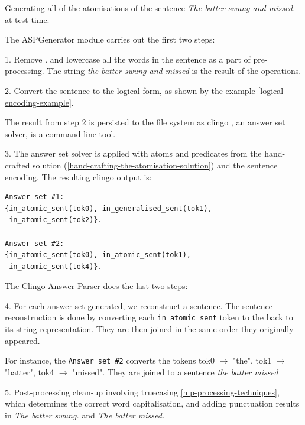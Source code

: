 \begin{example}
Generating all of the atomisations of the sentence \emph{The batter swung and missed.} at test time.

The ASPGenerator module carries out the first two steps:

1. Remove . and lowercase all the words in the sentence as a part of pre-processing. The string \emph{the batter swung and missed} is the result of the operations.

2. Convert the sentence to the logical form, as shown by the example \ref{logical-encoding-example}.

The result from step 2 is persisted to the file system as clingo \cite{RefWorks:RefID:22-clingo}, an answer set solver, is a command line tool.

3. The answer set solver is applied with atoms and predicates from the hand-crafted solution (\ref{hand-crafting-the-atomisation-solution}) and the sentence encoding. The resulting clingo output is:
\begin{verbatim}
Answer set #1: 
{in_atomic_sent(tok0), in_generalised_sent(tok1), 
 in_atomic_sent(tok2)}.
    
Answer set #2:
{in_atomic_sent(tok0), in_atomic_sent(tok1), 
 in_atomic_sent(tok4)}.
\end{verbatim}

The Clingo Answer Parser does the last two steps:

4. For each answer set generated, we reconstruct a sentence. 
The sentence reconstruction is done by converting each \verb+in_atomic_sent+ token to the back to its string representation.
They are then joined in the same order they originally appeared.

For instance, the \verb_Answer set #2_ converts the tokens tok0 $\rightarrow$ "the", tok1 $\rightarrow$ "batter", tok4 $\rightarrow$ "missed".
They are joined to a sentence \textit{the batter missed}

5. Post-processing clean-up involving truecasing \ref{nlp-processing-techniques}, which determines the correct word capitalisation, and adding punctuation results in \emph{The batter swung.} and \emph{The batter missed.} \\
\end{example}
 

